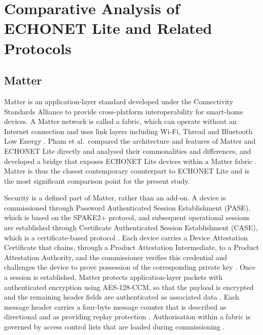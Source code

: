 \section{Comparative Analysis of ECHONET Lite and Related Protocols}
\label{sec:comparison}

\subsection{Matter}
\label{sec:matter}

Matter is an application-layer standard developed under the Connectivity Standards Alliance to provide cross-platform interoperability for smart-home devices. A Matter network is called a fabric, which can operate without an Internet connection and uses link layers including Wi-Fi, Thread and Bluetooth Low Energy \cite{Zohdi2026}. Pham et al.\ compared the architecture and features of Matter and ECHONET Lite directly and analysed their commonalities and differences, and developed a bridge that exposes ECHONET Lite devices within a Matter fabric \cite{phamMatterECHONETLite2024}. Matter is thus the closest contemporary counterpart to ECHONET Lite and is the most significant comparison point for the present study.

Security is a defined part of Matter, rather than an add-on. A device is commissioned through Password Authenticated Session Establishment (PASE), which is based on the SPAKE2+ protocol, and subsequent operational sessions are established through Certificate Authenticated Session Establishment (CASE), which is a certificate-based protocol \cite{Zohdi2026,SiliconLabsMatter}. Each device carries a Device Attestation Certificate that chains, through a Product Attestation Intermediate, to a Product Attestation Authority, and the commissioner verifies this credential and challenges the device to prove possession of the corresponding private key \cite{SiliconLabsMatter}. Once a session is established, Matter protects application-layer packets with authenticated encryption using AES-128-CCM, so that the payload is encrypted and the remaining header fields are authenticated as associated data \cite{Zohdi2026,Losty2026}. Each message header carries a four-byte message counter that is described as directional and as providing replay protection \cite{Zohdi2026}. Authorisation within a fabric is governed by access control lists that are loaded during commissioning \cite{SiliconLabsMatter}.

